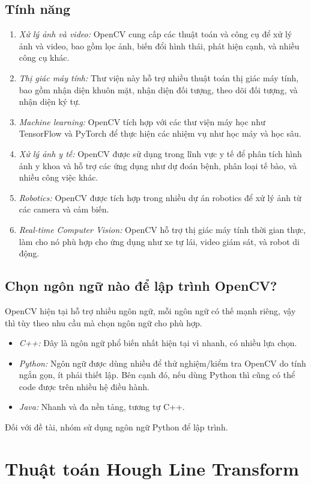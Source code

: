 \subsection{Tính năng}
\begin{enumerate}
    \item \textit{Xử lý ảnh và video:} OpenCV cung cấp các thuật toán và công cụ để xử lý ảnh và video, bao gồm lọc ảnh, biến đổi hình thái, phát hiện cạnh, và nhiều công cụ khác.
    \item \textit{Thị giác máy tính:} Thư viện này hỗ trợ nhiều thuật toán thị giác máy tính, bao gồm nhận diện khuôn mặt, nhận diện đối tượng, theo dõi đối tượng, và nhận diện ký tự.
    \item \textit{Machine learning:} OpenCV tích hợp với các thư viện máy học như TensorFlow và PyTorch để thực hiện các nhiệm vụ như học máy và học sâu.
    \item \textit{Xử lý ảnh y tế: }OpenCV được sử dụng trong lĩnh vực y tế để phân tích hình ảnh y khoa và hỗ trợ các ứng dụng như dự đoán bệnh, phân loại tế bào, và nhiều công việc khác.
    \item \textit{Robotics:} OpenCV được tích hợp trong nhiều dự án robotics để xử lý ảnh từ các camera và cảm biến.
    \item \textit{Real-time Computer Vision:} OpenCV hỗ trợ thị giác máy tính thời gian thực, làm cho nó phù hợp cho ứng dụng như xe tự lái, video giám sát, và robot di động.
\end{enumerate}
\subsection{Chọn ngôn ngữ nào để lập trình OpenCV?}
\tab OpenCV hiện tại hỗ trợ nhiều ngôn ngữ, mỗi ngôn ngữ có thế mạnh riêng, vậy thì tùy theo nhu cầu mà chọn ngôn ngữ cho phù hợp.
\begin{itemize}
    \item \textit{C++:} Đây là ngôn ngữ phổ biến nhất hiện tại vì nhanh, có nhiều lựa chọn.
    \item \textit{Python:} Ngôn ngữ được dùng nhiều để thử nghiệm/kiểm tra OpenCV do tính ngắn gọn, ít phải thiết lập. Bên cạnh đó, nếu dùng Python thì cũng có thể code được trên nhiều hệ điều hành.
    \item \textit{Java:} Nhanh và đa nền tảng, tương tự C++.
\end{itemize}
\tab Đối với đề tài, nhóm sử dụng ngôn ngữ Python để lập trình.
\section{Thuật toán Hough Line Transform}
